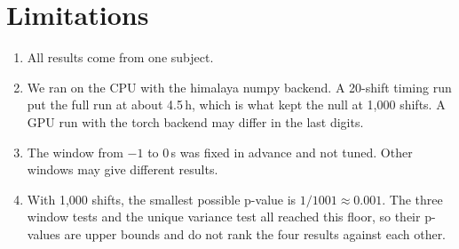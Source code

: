 \documentclass[11pt]{article}
\begin{document}
\section{Limitations}

\begin{enumerate}
\item All results come from one subject.
\item We ran on the CPU with the himalaya numpy backend. A 20-shift timing run put the full run at about 4.5\,h, which is what kept the null at 1,000 shifts. A GPU run with the torch backend may differ in the last digits.
\item The window from $-1$ to 0\,s was fixed in advance and not tuned. Other windows may give different results.
\item With 1,000 shifts, the smallest possible p-value is $1/1001 \approx 0.001$. The three window tests and the unique variance test all reached this floor, so their p-values are upper bounds and do not rank the four results against each other.
\end{enumerate}
\end{document}
